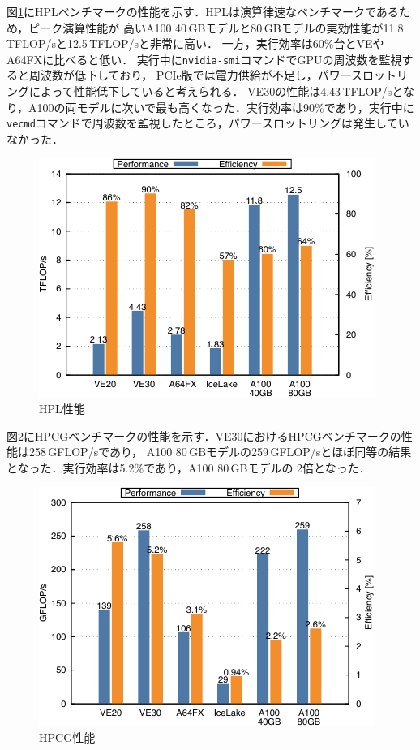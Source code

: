 ﻿\documentclass[submit,techrep,noauthor]{ipsj}
\begin{document}
図\ref{fig:hpl}にHPLベンチマークの性能を示す．HPLは演算律速なベンチマークであるため，ピーク演算性能が
高いA100 40\,GBモデルと80\,GBモデルの実効性能が11.8\,TFLOP/sと12.5\,TFLOP/sと非常に高い．
一方，実行効率は60\%台とVEやA64FXに比べると低い．
実行中に\verb|nvidia-smi|コマンドでGPUの周波数を監視すると周波数が低下しており，
PCIe版では電力供給が不足し，パワースロットリングによって性能低下していると考えられる．
VE30の性能は4.43\,TFLOP/sとなり，A100の両モデルに次いで最も高くなった．実行効率は90\%であり，実行中に
\verb|vecmd|コマンドで周波数を監視したところ，パワースロットリングは発生していなかった．

\begin{figure}
  \centering
  \includegraphics{figs/hpl.pdf}
  \caption{HPL性能~\cite{Takahashi2023}}\label{fig:hpl}
\end{figure}

図\ref{fig:hpcg}にHPCGベンチマークの性能を示す．VE30におけるHPCGベンチマークの性能は258\,GFLOP/sであり，
A100 80\,GBモデルの259\,GFLOP/sとほぼ同等の結果となった．実行効率は5.2\%であり，A100 80\,GBモデルの
2倍となった．

\begin{figure}
  \centering
  \includegraphics{figs/hpcg.pdf}
  \caption{HPCG性能~\cite{Takahashi2023}}\label{fig:hpcg}
\end{figure}
\end{document}
